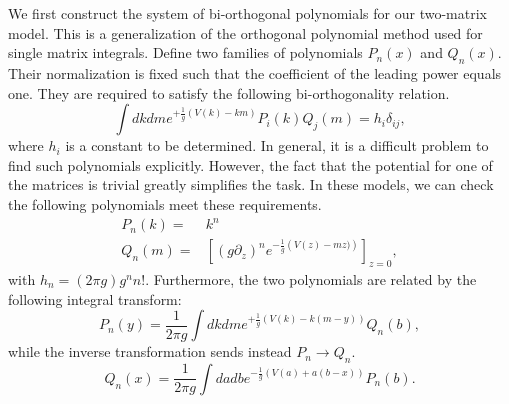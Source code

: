 \documentclass[english]{article}
\begin{document}
We first construct the system of bi-orthogonal polynomials for our two-matrix model. This is a generalization of the orthogonal polynomial method used for single matrix integrals. Define two families of polynomials $P_{n}(x)$ and $Q_{n}(x)$. Their normalization is fixed such that the coefficient of the leading power equals one. They are required to satisfy the following bi-orthogonality relation. 
\begin{equation}
    \int dk dm e^{+\frac{1}{g}\left( V(k)-k m \right)} P_{i}(k) Q_{j}(m) = h_{i} \delta_{i j},
\end{equation}
where $h_i$ is a constant to be determined. In general, it is a difficult problem to find such polynomials explicitly. However, the fact that the potential for one of the matrices is trivial greatly simplifies the task. In these models, we can check the following polynomials meet these requirements.
\begin{align}
     P_{n}(k)= & k^{n}\\
    Q_{n}(m)= & [(g \partial_{z})^{n} e^{-\frac{1}{g}\left( V(z)-mz)\right)}]_{z=0},
\end{align}
with $h_{n}=(2\pi g) g^{n} n!$.
Furthermore, the two polynomials are related by the following integral transform:
\begin{equation} \label{eq:dualFZZTtoFZZT}
    P_{n}(y) = \frac{1}{2 \pi g} \int dk dm e^{+\frac{1}{g}\left( V(k)-k(m-y) \right)} Q_{n}(b),
\end{equation}
while the inverse transformation sends instead $P_{n} \rightarrow Q_{n}$.
\begin{equation}
    Q_{n}(x)= \frac{1}{2 \pi g} \int da db e^{-\frac{1}{g}\left(V(a) +a(b-x)\right)} P_{n}(b).
\end{equation}
\end{document}
